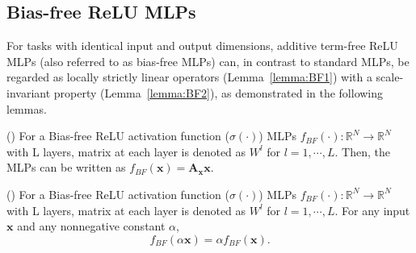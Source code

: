 \subsection{Bias-free ReLU MLPs}
\label{section:BF}
For tasks with identical input and output dimensions, additive term-free ReLU MLPs (also referred to as bias-free MLPs) can, in contrast to standard MLPs, be regarded as locally strictly linear operators (Lemma~\ref{lemma:BF1}) with a scale-invariant property (Lemma~\ref{lemma:BF2}), as demonstrated in the following lemmas.

\begin{lemma}
    (\citet{mohan2019robust}) For a Bias-free ReLU activation function ($\sigma(\cdot)$) MLPs $f_{BF}(\cdot): \mathbb{R}^N\rightarrow\mathbb{R}^N$ with L layers, matrix at each layer is denoted as $W^l$ for $l=1,\cdots,L$. Then, the MLPs can be written as $f_{BF}(\mathbf{x})=\mathbf{A}_\mathbf{x}\mathbf{x}$.
\label{lemma:BF1}
\end{lemma}

\begin{lemma}
(\citet{mohan2019robust}) For a Bias-free ReLU activation function ($\sigma(\cdot)$) MLPs $f_{BF}(\cdot): \mathbb{R}^N\rightarrow\mathbb{R}^N$ with L layers, matrix at each layer is denoted as $W^l$ for $l=1,\cdots,L$.  For any input $\mathbf{x}$ and any nonnegative constant $\alpha$,
\begin{equation}
f_{BF}(\alpha \mathbf{x}) = \alpha f_{BF}(\mathbf{x}).
\end{equation}
\label{lemma:BF2}
\vspace{-15pt}
\end{lemma}

